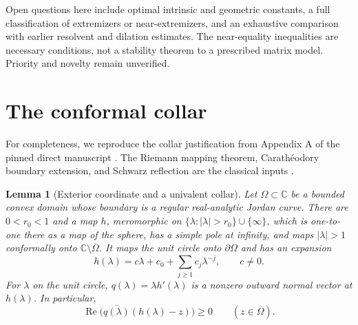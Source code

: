 \documentclass[11pt]{article}
\newtheorem{lemma}[theorem]{Lemma}
\theoremstyle{remark}\newtheorem{remark}[theorem]{Remark}
\begin{document}
Open questions here include optimal intrinsic and geometric constants, a full classification of extremizers or near-extremizers, and an exhaustive comparison with earlier resolvent and dilation estimates. The near-equality inequalities are necessary conditions, not a stability theorem to a prescribed matrix model. Priority and novelty remain unverified.

\appendix
\section{The conformal collar}\label{sec:collar}
For completeness, we reproduce the collar justification from Appendix A of the pinned direct manuscript \cite{OAI}. The Riemann mapping theorem, Carath\'eodory boundary extension, and Schwarz reflection are the classical inputs \cite{Ahlfors}.

\begin{lemma}[Exterior coordinate and a univalent collar]
\label{lem:exterior-collar}
Let $\Omega\subset\mathbb C$ be a bounded convex domain whose boundary
is a regular real-analytic Jordan curve. There are $0<r_0<1$ and a map
$h$, meromorphic on $\{\lambda:|\lambda|>r_0\}\cup\{\infty\}$,
which is one-to-one there as a map of the sphere, has a simple pole at
infinity, and maps $|\lambda|>1$ conformally onto
$\mathbb C\setminus\overline\Omega$. It maps the unit circle onto
$\partial\Omega$ and has an expansion
\[
 h(\lambda)=c\lambda+c_0+\sum_{j\ge1}c_j\lambda^{-j},\qquad c\ne0.
\]
For $\lambda$ on the unit circle, $q(\lambda)=\lambda h'(\lambda)$
is a nonzero outward normal vector at $h(\lambda)$. In particular,
\[
 \operatorname{Re}\bigl(\overline{q(\lambda)}(h(\lambda)-z)\bigr)
 \ge0\qquad (z\in\overline\Omega).
\]
\end{lemma}
\end{document}
